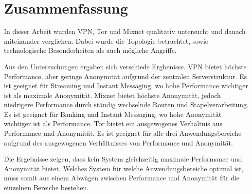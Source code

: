 \section{Zusammenfassung}

In dieser Arbeit wurden VPN, Tor und Mixnet qualitativ untersucht und danach miteinander verglichen. Dabei wurde die Topologie betrachtet, sowie technologische Besonderheiten als auch mögliche Angriffe.

Aus den Untersuchungen ergaben sich verschiede Ergbenisse.
VPN bietet höchste Performance, aber geringe Anonymität aufgrund der zentralen Serverstruktur. Es ist geeignet für Streaming und Instant Messaging, wo hohe Performance wichtiger ist als maximale Anonymität.
Mixnet bietet höchste Anonymität, jedoch niedrigere Performance durch ständig wechselnde Routen und Stapelverarbeitung. Es ist geeignet für Banking und Instant Messaging, wo hohe Anonymität wichtiger ist als Performance.
Tor bietet ein ausgewogenes Verhältnis aus Performance und Anonymität. Es ist geeignet für alle drei Anwendungsbereiche aufgrund des ausgewogenen Verhältnisses von Performance und Anonymität.

Die Ergebnisse zeigen, dass kein System gleichzeitig maximale Performance und Anonymität bietet. Welches System für welche Anwendungsbereiche optimal ist, muss somit aus einem Abwägen zwischen Performance und Anonymität für die einzelnen Bereiche bestehen.
